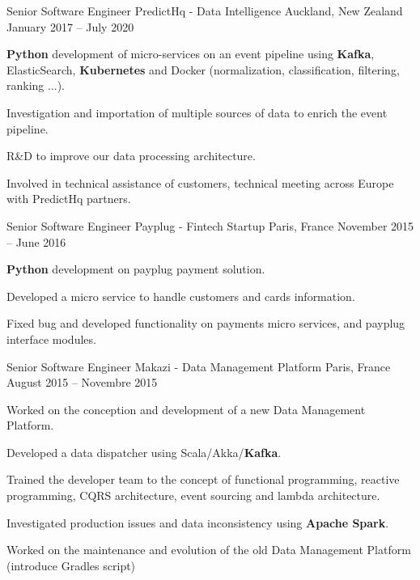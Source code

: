 \begin{cventries}
  \cventry
    {Senior Software Engineer} %
    {PredictHq - Data Intelligence} %
    {Auckland, New Zealand} %
    {January 2017 – July 2020} %
    {
      \begin{cvitems} %
        \item {\textbf{Python} development of micro-services on an event pipeline using \textbf{Kafka}, ElasticSearch, \textbf{Kubernetes} and Docker (normalization, classification, filtering, ranking ...).}
        \item {Investigation and importation of multiple sources of data to enrich the event pipeline.}
        \item {R\&D to improve our data processing architecture.}
        \item {Involved in technical assistance of customers, technical meeting across Europe with PredictHq partners.}
      \end{cvitems}
    }

  \cventry
    {Senior Software Engineer} %
    {Payplug - Fintech Startup} %
    {Paris, France} %
    {November 2015 – June 2016} %
    {
      \begin{cvitems} %
        \item {\textbf{Python} development on payplug payment solution.}
        \item {Developed a micro service to handle customers and cards information.}
        \item {Fixed bug and developed functionality on payments micro services, and payplug interface modules.}
      \end{cvitems}
    }

  \cventry
    {Senior Software Engineer} %
    {Makazi - Data Management Platform} %
    {Paris, France} %
    {August 2015 – Novembre 2015} %
    {
      \begin{cvitems} %
        \item {Worked on the conception and development of a new Data Management Platform.}
        \item {Developed a data dispatcher using Scala/Akka/\textbf{Kafka}.}
        \item {Trained the developer team to the concept of functional programming, reactive programming, CQRS architecture, event sourcing and lambda architecture.}
        \item {Investigated production issues and data inconsistency using \textbf{Apache Spark}.}
        \item {Worked on the maintenance and evolution of the old Data Management Platform (introduce Gradles script)}
      \end{cvitems}
    }


\end{cventries}
